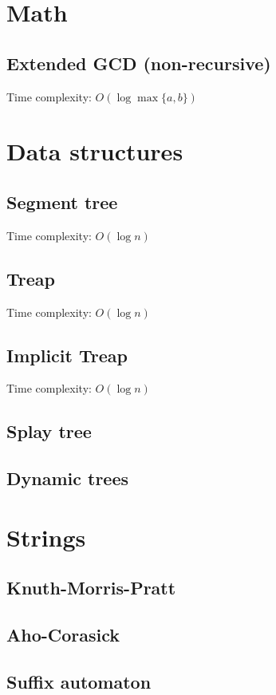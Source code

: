 \documentclass[12pt]{article}
\begin{document}
\pagestyle{fancy}
\newpage

\section{Math}
\subsection{Extended GCD (non-recursive)}
Time complexity: $O(\log \max \{a, b\})$


\section{Data structures}
\subsection{Segment tree}
Time complexity: $O(\log n)$
\subsection{Treap}
Time complexity: $O(\log n)$
\subsection{Implicit Treap}
Time complexity: $O(\log n)$
\subsection{Splay tree}
\subsection{Dynamic trees}

\section{Strings}
\subsection{Knuth-Morris-Pratt}

\subsection{Aho-Corasick}

\subsection{Suffix automaton}
\end{document}
